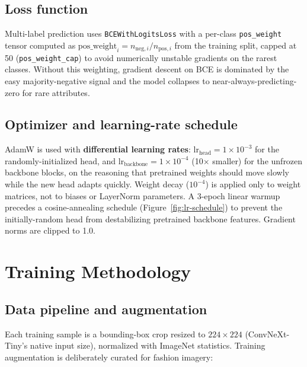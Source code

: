 \documentclass[11pt]{article}
\newcommand{\code}[1]{\texttt{\small #1}}
\begin{document}
\subsection{Loss function}

Multi-label prediction uses \code{BCEWithLogitsLoss} with a per-class \code{pos\_weight} tensor computed as $\text{pos\_weight}_i = n_{\text{neg},i} / n_{\text{pos},i}$ from the training split, capped at 50 (\code{pos\_weight\_cap}) to avoid numerically unstable gradients on the rarest classes. Without this weighting, gradient descent on BCE is dominated by the easy majority-negative signal and the model collapses to near-always-predicting-zero for rare attributes.

\subsection{Optimizer and learning-rate schedule}

AdamW is used with \textbf{differential learning rates}: $\text{lr}_{\text{head}} = 1\times10^{-3}$ for the randomly-initialized head, and $\text{lr}_{\text{backbone}} = 1\times10^{-4}$ (10$\times$ smaller) for the unfrozen backbone blocks, on the reasoning that pretrained weights should move slowly while the new head adapts quickly. Weight decay ($10^{-4}$) is applied only to weight matrices, not to biases or LayerNorm parameters. A 3-epoch linear warmup precedes a cosine-annealing schedule (Figure~\ref{fig:lr-schedule}) to prevent the initially-random head from destabilizing pretrained backbone features. Gradient norms are clipped to 1.0.

\section{Training Methodology}

\subsection{Data pipeline and augmentation}

Each training sample is a bounding-box crop resized to $224\times224$ (ConvNeXt-Tiny's native input size), normalized with ImageNet statistics. Training augmentation is deliberately curated for fashion imagery:
\end{document}
